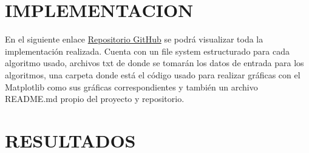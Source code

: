\documentclass{article}
\begin{document}

\section{IMPLEMENTACION}
En el siguiente enlace \href{https://github.com/abelborit/computer-science-master/tree/main/MCC-01_algorithms-and-data-structures}{Repositorio GitHub} se podrá visualizar toda la implementación realizada. Cuenta con un file system estructurado para cada algoritmo usado, archivos txt de donde se tomarán los datos de entrada para los algoritmos, una carpeta donde está el código usado para realizar gráficas con el Matplotlib como sus gráficas correspondientes y también un archivo README.md propio del proyecto y repositorio.

\section{RESULTADOS}
\end{document}
